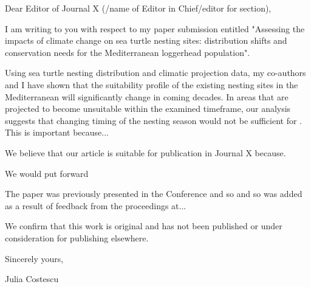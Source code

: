 \documentclass{letter}
\begin{document}

Dear Editor of Journal X (/name of Editor in Chief/editor for section),

I am writing to you with respect to my paper submission entitled "Assessing the impacts of climate change on sea turtle nesting sites: distribution shifts and conservation needs for the Mediterranean loggerhead population". 

Using sea turtle nesting distribution and climatic projection data, my co-authors and I have shown that the suitability profile of the existing nesting sites in the Mediterranean will significantly change in coming decades. In areas that are projected to become unsuitable within the examined timeframe, our analysis suggests that changing timing of the nesting season would not be sufficient for . This is important because...

We believe that our article is suitable for publication in Journal X because.

We would put forward    

The paper was previously presented in the Conference and so and so was added as a result of feedback from the proceedings at...

We confirm that this work is original and has not been published or under consideration for publishing elsewhere.


Sincerely yours,
    
Julia Costescu
\end{document}
